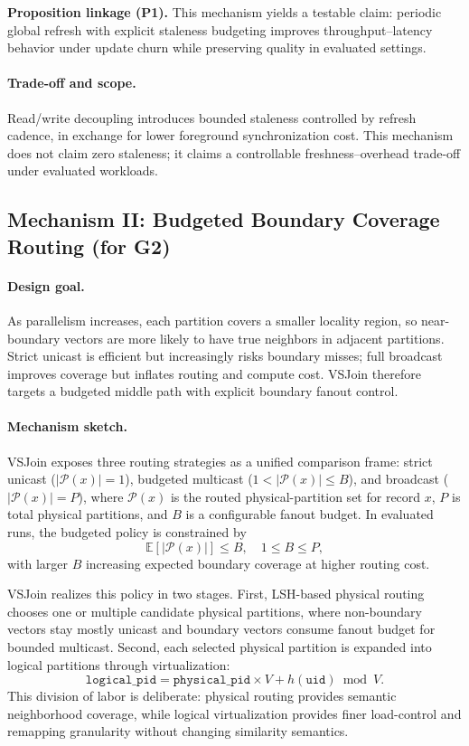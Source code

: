 \noindent\textbf{Proposition linkage (P1).}
This mechanism yields a testable claim: periodic global refresh with explicit staleness budgeting improves throughput--latency behavior under update churn while preserving quality in evaluated settings.

\paragraph{Trade-off and scope.}
Read/write decoupling introduces bounded staleness controlled by refresh cadence, in exchange for lower foreground synchronization cost. This mechanism does not claim zero staleness; it claims a controllable freshness--overhead trade-off under evaluated workloads.

\subsection{Mechanism II: Budgeted Boundary Coverage Routing (for G2)}

\paragraph{Design goal.}
As parallelism increases, each partition covers a smaller locality region, so near-boundary vectors are more likely to have true neighbors in adjacent partitions. Strict unicast is efficient but increasingly risks boundary misses; full broadcast improves coverage but inflates routing and compute cost. VSJoin therefore targets a budgeted middle path with explicit boundary fanout control.

\paragraph{Mechanism sketch.}
VSJoin exposes three routing strategies as a unified comparison frame: strict unicast ($|\mathcal{P}(x)|=1$), budgeted multicast ($1<|\mathcal{P}(x)|\le B$), and broadcast ($|\mathcal{P}(x)|=P$), where $\mathcal{P}(x)$ is the routed physical-partition set for record $x$, $P$ is total physical partitions, and $B$ is a configurable fanout budget. In evaluated runs, the budgeted policy is constrained by
\[
\mathbb{E}[|\mathcal{P}(x)|] \le B, \quad 1 \le B \le P,
\]
with larger $B$ increasing expected boundary coverage at higher routing cost.

VSJoin realizes this policy in two stages. First, LSH-based physical routing chooses one or multiple candidate physical partitions, where non-boundary vectors stay mostly unicast and boundary vectors consume fanout budget for bounded multicast. Second, each selected physical partition is expanded into logical partitions through virtualization:
\[
\texttt{logical\_pid}=\texttt{physical\_pid}\times V + h(\texttt{uid})\bmod V.
\]
This division of labor is deliberate: physical routing provides semantic neighborhood coverage, while logical virtualization provides finer load-control and remapping granularity without changing similarity semantics.

